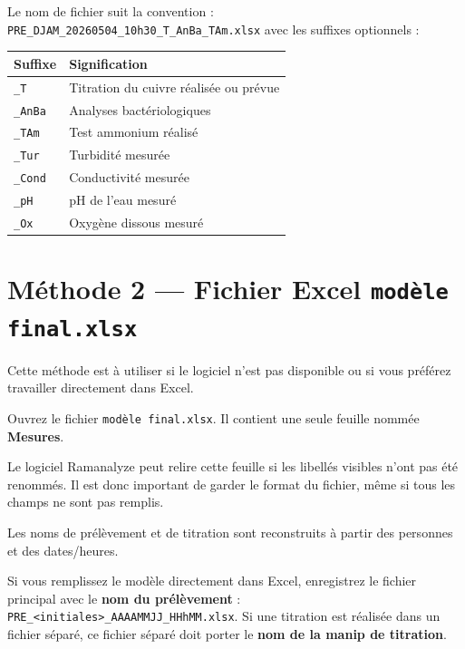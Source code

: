 \documentclass[12pt, a4paper]{article}
\begin{document}
Le nom de fichier suit la convention :
\texttt{PRE\_DJAM\_20260504\_10h30\_T\_AnBa\_TAm.xlsx}
avec les suffixes optionnels :

\begin{center}
\begin{tabularx}{0.72\linewidth}{C{1.6cm} L{8cm}}
  \toprule
  \textbf{Suffixe} & \textbf{Signification} \\
  \midrule
  \texttt{\_T} & Titration du cuivre réalisée ou prévue \\
  \texttt{\_AnBa} & Analyses bactériologiques \\
  \texttt{\_TAm} & Test ammonium réalisé \\
  \texttt{\_Tur} & Turbidité mesurée \\
  \texttt{\_Cond} & Conductivité mesurée \\
  \texttt{\_pH} & pH de l'eau mesuré \\
  \texttt{\_Ox} & Oxygène dissous mesuré \\
  \bottomrule
\end{tabularx}
\end{center}

\newpage

\section{Méthode 2 — Fichier Excel \texttt{modèle final.xlsx}}

Cette méthode est à utiliser si le logiciel n'est pas disponible ou
si vous préférez travailler directement dans Excel.

Ouvrez le fichier \texttt{modèle final.xlsx}. Il contient une seule
feuille nommée \textbf{Mesures}.

Le logiciel Ramanalyze peut relire cette feuille si les libellés visibles
n'ont pas été renommés. Il est donc important de garder le format du
fichier, même si tous les champs ne sont pas remplis.

Les noms de prélèvement et de titration sont reconstruits à partir des
personnes et des dates/heures.

\begin{important}
  Si vous remplissez le modèle directement dans Excel, enregistrez le
  fichier principal avec le \textbf{nom du prélèvement} :
  \texttt{PRE\_<initiales>\_AAAAMMJJ\_HHhMM.xlsx}. Si une titration
  est réalisée dans un fichier séparé, ce fichier séparé doit porter
  le \textbf{nom de la manip de titration}.
\end{important}
\end{document}
